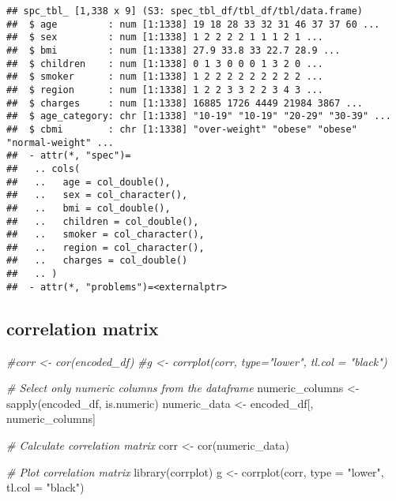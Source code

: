 \documentclass[
]{article}
\newenvironment{Shaded}{\begin{snugshade}}{\end{snugshade}}
\newcommand{\AttributeTok}[1]{\textcolor[rgb]{0.77,0.63,0.00}{#1}}
\newcommand{\CommentTok}[1]{\textcolor[rgb]{0.56,0.35,0.01}{\textit{#1}}}
\newcommand{\FunctionTok}[1]{\textcolor[rgb]{0.00,0.00,0.00}{#1}}
\newcommand{\NormalTok}[1]{#1}
\newcommand{\OtherTok}[1]{\textcolor[rgb]{0.56,0.35,0.01}{#1}}
\newcommand{\StringTok}[1]{\textcolor[rgb]{0.31,0.60,0.02}{#1}}
\begin{document}
\begin{verbatim}
## spc_tbl_ [1,338 x 9] (S3: spec_tbl_df/tbl_df/tbl/data.frame)
##  $ age         : num [1:1338] 19 18 28 33 32 31 46 37 37 60 ...
##  $ sex         : num [1:1338] 1 2 2 2 2 1 1 1 2 1 ...
##  $ bmi         : num [1:1338] 27.9 33.8 33 22.7 28.9 ...
##  $ children    : num [1:1338] 0 1 3 0 0 0 1 3 2 0 ...
##  $ smoker      : num [1:1338] 1 2 2 2 2 2 2 2 2 2 ...
##  $ region      : num [1:1338] 1 2 2 3 3 2 2 3 4 3 ...
##  $ charges     : num [1:1338] 16885 1726 4449 21984 3867 ...
##  $ age_category: chr [1:1338] "10-19" "10-19" "20-29" "30-39" ...
##  $ cbmi        : chr [1:1338] "over-weight" "obese" "obese" "normal-weight" ...
##  - attr(*, "spec")=
##   .. cols(
##   ..   age = col_double(),
##   ..   sex = col_character(),
##   ..   bmi = col_double(),
##   ..   children = col_double(),
##   ..   smoker = col_character(),
##   ..   region = col_character(),
##   ..   charges = col_double()
##   .. )
##  - attr(*, "problems")=<externalptr>
\end{verbatim}

\hypertarget{correlation-matrix}{%
\subsection{correlation matrix}\label{correlation-matrix}}

\begin{Shaded}
\begin{Highlighting}[]
\CommentTok{\#corr \textless{}{-} cor(encoded\_df)}
\CommentTok{\#g \textless{}{-} corrplot(corr, type="lower", tl.col = "black") }


\CommentTok{\# Select only numeric columns from the dataframe}
\NormalTok{numeric\_columns }\OtherTok{\textless{}{-}} \FunctionTok{sapply}\NormalTok{(encoded\_df, is.numeric)}
\NormalTok{numeric\_data }\OtherTok{\textless{}{-}}\NormalTok{ encoded\_df[, numeric\_columns]}

\CommentTok{\# Calculate correlation matrix}
\NormalTok{corr }\OtherTok{\textless{}{-}} \FunctionTok{cor}\NormalTok{(numeric\_data)}

\CommentTok{\# Plot correlation matrix}
\FunctionTok{library}\NormalTok{(corrplot)}
\NormalTok{g }\OtherTok{\textless{}{-}} \FunctionTok{corrplot}\NormalTok{(corr, }\AttributeTok{type =} \StringTok{"lower"}\NormalTok{, }\AttributeTok{tl.col =} \StringTok{"black"}\NormalTok{)}
\end{Highlighting}
\end{Shaded}
\end{document}

